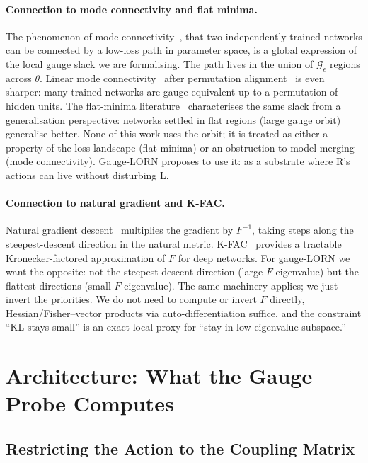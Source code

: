 \documentclass[11pt, a4paper]{article}
\theoremstyle{plain}
\theoremstyle{definition}
\theoremstyle{remark}
\begin{document}
\paragraph{Connection to mode connectivity and flat minima.}
The phenomenon of mode connectivity~\cite{garipov2018loss, draxler2018essentially}, that two independently-trained networks can be connected by a low-loss path in parameter space, is a global expression of the local gauge slack we are formalising.
The path lives in the union of $\mathcal{G}_{\epsilon}$ regions across $\theta$.
Linear mode connectivity~\cite{frankle2020linear} after permutation alignment~\cite{ainsworth2023git} is even sharper: many trained networks are gauge-equivalent up to a permutation of hidden units.
The flat-minima literature~\cite{hochreiter1997flat, keskar2017large, foret2021sam} characterises the same slack from a generalisation perspective: networks settled in flat regions (large gauge orbit) generalise better.
None of this work uses the orbit; it is treated as either a property of the loss landscape (flat minima) or an obstruction to model merging (mode connectivity).
Gauge-LORN proposes to use it: as a substrate where R's actions can live without disturbing L.

\paragraph{Connection to natural gradient and K-FAC.}
Natural gradient descent~\cite{amari1998natural} multiplies the gradient by $F^{-1}$, taking steps along the steepest-descent direction in the natural metric.
K-FAC~\cite{martens2015kfac} provides a tractable Kronecker-factored approximation of $F$ for deep networks.
For gauge-LORN we want the opposite: not the steepest-descent direction (large $F$ eigenvalue) but the flattest directions (small $F$ eigenvalue).
The same machinery applies; we just invert the priorities.
We do not need to compute or invert $F$ directly, Hessian/Fisher--vector products via auto-differentiation suffice, and the constraint ``KL stays small'' is an exact local proxy for ``stay in low-eigenvalue subspace.''


\section{Architecture: What the Gauge Probe Computes}
\label{sec:architecture-part2}

\subsection{Restricting the Action to the Coupling Matrix}
\end{document}

